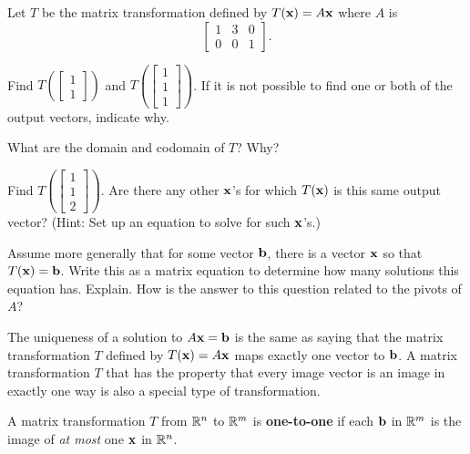 \begin{activity} \label{act:1_g_5} Let $T$ be the matrix transformation defined by $T(\mathbf{x}) = A \mathbf{x}$ where $A$ is 	
\[\left[ \begin{array}{ccc} 1 & 3 & 0 \\ 0 & 0 & 1 \end{array} \right].\]
\ba
\item Find $T\left(\left[\begin{array}{c} 1\\1\end{array}\right]\right)$ and $T\left(\left[\begin{array}{c} 1\\1\\1\end{array}\right]\right)$. If it is not possible to find one or both of the output vectors, indicate why.


\item What are the domain and codomain of $T$? Why?


\item Find $T\left(\left[\begin{array}{c} 1\\1\\2\end{array}\right]\right)$. Are there any other $\mathbf{x}$'s for which $T(\mathbf{x})$ is this same output vector? (Hint: Set up an equation to solve for such $\mathbf{x}$'s.)
  
\item Assume more generally that for some vector $\mathbf{b}$, there is a vector $\mathbf{x}$ so that $T(\mathbf{x}) = \mathbf{b}$. Write this as a matrix equation to determine how many solutions this equation has. Explain. How is the answer to this question related to the pivots of $A$?

\ea

\end{activity}


The uniqueness of a solution to $A \mathbf{x} = \mathbf{b}$ is the same as saying that the matrix transformation $T$ defined by $T(\mathbf{x}) = A\mathbf{x}$ maps exactly one vector to $\mathbf{b}$. A matrix transformation $T$ that has the property that every image vector is an image in exactly one way is also a special type of transformation.


\begin{definition} A matrix transformation $T$ from $\mathbb{R}^n$ to $\mathbb{R}^m$ is \textbf{one-to-one} if each $\mathbf{b}$ in $\mathbb{R}^m$ is the image of \emph{at most} one $\mathbf{x}$ in $\mathbb{R}^n$.
\end{definition}



